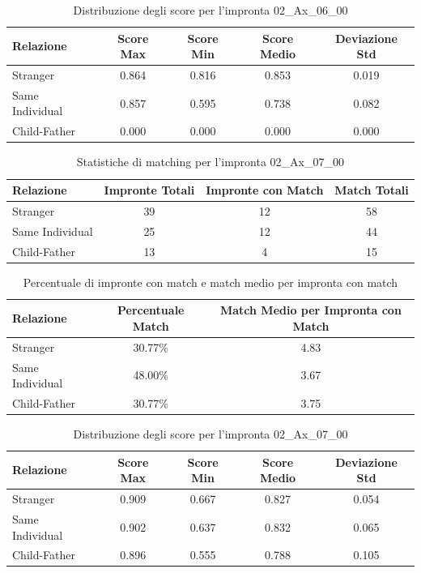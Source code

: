\begin{table}[htbp]
\centering
\caption{Distribuzione degli score per l'impronta 02\_Ax\_06\_00}
\label{tab:scores_02_Ax_06_00}
\begin{tabular}{|l|c|c|c|c|}
\hline
\textbf{Relazione} & \textbf{Score Max} & \textbf{Score Min} & \textbf{Score Medio} & \textbf{Deviazione Std} \\
\hline
Stranger & 0.864 & 0.816 & 0.853 & 0.019 \\
\hline
Same Individual & 0.857 & 0.595 & 0.738 & 0.082 \\
\hline
Child-Father & 0.000 & 0.000 & 0.000 & 0.000 \\
\hline
\end{tabular}
\end{table}


\begin{table}[htbp]
\centering
\caption{Statistiche di matching per l'impronta 02\_Ax\_07\_00}
\label{tab:results_02_Ax_07_00}
\begin{tabular}{|l|c|c|c|}
\hline
\textbf{Relazione} & \textbf{Impronte Totali} & \textbf{Impronte con Match} & \textbf{Match Totali} \\
\hline
Stranger & 39 & 12 & 58 \\
\hline
Same Individual & 25 & 12 & 44 \\
\hline
Child-Father & 13 & 4 & 15 \\
\hline
\end{tabular}
\end{table}


\begin{table}[htbp]
\centering
\caption{Percentuale di impronte con match e match medio per impronta con match}
\label{tab:match_percentage_02_Ax_07_00}
\begin{tabular}{|l|c|c|}
\hline
\textbf{Relazione} & \textbf{Percentuale Match} & \textbf{Match Medio per Impronta con Match} \\
\hline
Stranger & 30.77\% & 4.83 \\
\hline
Same Individual & 48.00\% & 3.67 \\
\hline
Child-Father & 30.77\% & 3.75 \\
\hline
\end{tabular}
\end{table}


\begin{table}[htbp]
\centering
\caption{Distribuzione degli score per l'impronta 02\_Ax\_07\_00}
\label{tab:scores_02_Ax_07_00}
\begin{tabular}{|l|c|c|c|c|}
\hline
\textbf{Relazione} & \textbf{Score Max} & \textbf{Score Min} & \textbf{Score Medio} & \textbf{Deviazione Std} \\
\hline
Stranger & 0.909 & 0.667 & 0.827 & 0.054 \\
\hline
Same Individual & 0.902 & 0.637 & 0.832 & 0.065 \\
\hline
Child-Father & 0.896 & 0.555 & 0.788 & 0.105 \\
\hline
\end{tabular}
\end{table}


